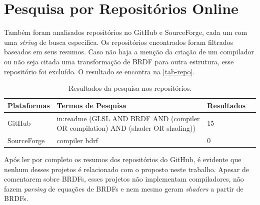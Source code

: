 \documentclass[english,
               brazil,
               bsc] %
               {dcomp-abntex2}
\begin{document}
\section{Pesquisa por Repositórios Online}
Também foram analisados repositórios no GitHub e SourceForge, cada um com uma \textit{string} de busca específica. Os repositórios encontrados foram filtrados baseados em seus resumos. Caso não haja a menção da criação de um compilador ou não seja citada uma transformação de BRDF para outra estrutura, esse repositório foi excluído. O resultado se encontra na \autoref{tab-repo}.






\begin{table}[H]
\ABNTEXfontereduzida
\caption[bases]{\small Resultados da pesquisa nos repositórios.}
\label{tab-repo}
\begin{tabular}{p{2.6cm}|p{6.0cm}|p{2.25cm}|p{3.40cm}}
   \textbf{Plataformas} & \textbf{Termos de Pesquisa}  & \textbf{Resultados}\\
   \hline
   GitHub
   &
   in:readme (GLSL AND BRDF AND  (compiler OR compilation) AND (shader OR shading))
   & 15
   \\ \hline
   SourceForge
   &
   compiler bdrf
   & 0
\end{tabular}
\end{table}




Após ler por completo os resumos dos repositórios do GitHub, é evidente que nenhum desses projetos é relacionado com o proposto neste trabalho. Apesar de comentarem sobre BRDFs, esses projetos não implementam compiladores, não fazem \textit{parsing} de equações de BRDFs e nem mesmo geram \textit{shaders} a partir de BRDFs.







\end{document}
